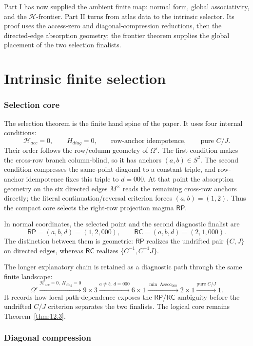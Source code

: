 \documentclass[11pt]{article}
\theoremstyle{definition}
\newcommand{\RP}{\mathsf{RP}}
\newcommand{\RC}{\mathsf{RC}}
\begin{document}
Part I has now supplied the ambient finite map: normal form, global
associativity, and the \(\mathcal H\)-frontier. Part II turns from
atlas data to the intrinsic selector. Its proof uses the access-zero and
diagonal-compression reductions, then the directed-edge absorption
geometry; the frontier theorem supplies the global placement of the two
selection finalists.

\part{Intrinsic finite selection}

\section{Selection core}\label{selection-core}

The selection theorem is the finite hand spine of the paper.  It uses four
internal conditions:
\[
\boxed{
\mathcal H_{acc}=0,
\qquad
H_{diag}=0,
\qquad
\text{row-anchor idempotence},
\qquad
\text{pure }C/J.
}
\]
Their order follows the row/column geometry of \(\Omega'\).  The first
condition makes the cross-row branch column-blind, so it has anchors
\((a,b)\in S^2\).  The second condition compresses the same-point diagonal
to a constant triple, and row-anchor idempotence fixes this triple to
\(d=000\).  At that point the absorption geometry on the six directed edges
\(M^\times\) reads the remaining cross-row anchors directly; the literal
continuation/reversal criterion forces \((a,b)=(1,2)\).  Thus the compact
core selects the right-row projection magma \(\RP\).

In normal coordinates, the selected point and the second diagnostic finalist
are
\[
\RP=(a,b,d)=(1,2,000),
\qquad
\RC=(a,b,d)=(2,1,000).
\]
The distinction between them is geometric: \(\RP\) realizes the undrifted
pair \(\{C,J\}\) on directed edges, whereas \(\RC\) realizes
\(\{C^{-1},C^{-1}J\}\).

The longer explanatory chain is retained as a diagnostic path through the
same finite landscape:
\[
\Omega'
\xrightarrow{\mathcal H_{acc}=0,
\ H_{diag}=0}
9\times3
\xrightarrow{a\ne b,
\ d=000}
6\times1
\xrightarrow{\min\operatorname{Assoc}_{000}}
2\times1
\xrightarrow{\text{pure }C/J}
1.
\]
It records how local path-dependence exposes the \(\RP\)/\(\RC\) ambiguity
before the undrifted \(C/J\) criterion separates the two finalists.  The
logical core remains Theorem~\ref{thm:12.3}.

\section{Diagonal compression}\label{diagonal-compression}
\end{document}
